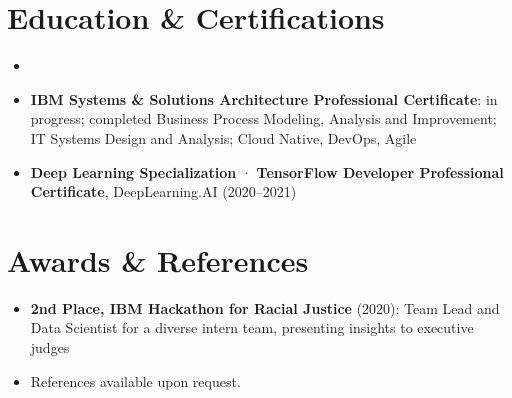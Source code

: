 \documentclass[11pt,a4paper,sans]{moderncv}
\begin{document}

\section{Education \& Certifications}
\vspace{1pt}
\begin{itemize}

\item{}

\vspace{3pt}

\item \textbf{IBM Systems \& Solutions Architecture Professional Certificate}: in progress; completed Business Process Modeling, Analysis and Improvement; IT Systems Design and Analysis; Cloud Native, DevOps, Agile

\item \textbf{Deep Learning Specialization} · \textbf{TensorFlow Developer Professional Certificate}, DeepLearning.AI (2020--2021)

\end{itemize}


\section{Awards \& References}
\vspace{1pt}
\begin{itemize}
\item \textbf{2nd Place, IBM Hackathon for Racial Justice} (2020): Team Lead and Data Scientist for a diverse intern team, presenting insights to executive judges
\item References available upon request.
\end{itemize}
\end{document}
